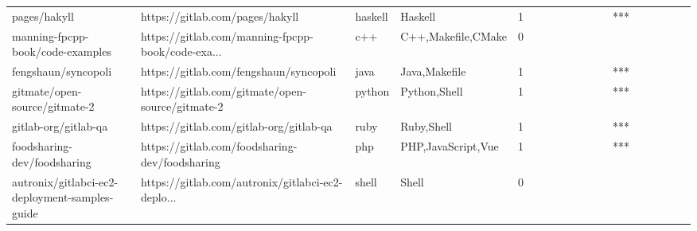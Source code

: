 \begin{tabular}{llllrlllllllllllll}
pages/hakyll                                       &                    https://gitlab.com/pages/hakyll &           haskell &                                            Haskell &       1 &         &        &           &                &                 &        &           &       *** &          &          &       &              &          \\
manning-fpcpp-book/code-examples                   &  https://gitlab.com/manning-fpcpp-book/code-exa... &               c++ &                                 C++,Makefile,CMake &       0 &         &        &           &                &                 &        &           &           &          &          &       &              &          \\
fengshaun/syncopoli                                &             https://gitlab.com/fengshaun/syncopoli &              java &                                      Java,Makefile &       1 &         &        &           &                &                 &        &           &       *** &          &          &       &              &          \\
gitmate/open-source/gitmate-2                      &   https://gitlab.com/gitmate/open-source/gitmate-2 &            python &                                       Python,Shell &       1 &         &        &           &                &                 &        &           &       *** &          &          &       &              &          \\
gitlab-org/gitlab-qa                               &            https://gitlab.com/gitlab-org/gitlab-qa &              ruby &                                         Ruby,Shell &       1 &         &        &           &                &                 &        &           &       *** &          &          &       &              &          \\
foodsharing-dev/foodsharing                        &     https://gitlab.com/foodsharing-dev/foodsharing &               php &                                 PHP,JavaScript,Vue &       1 &         &        &           &                &                 &        &           &       *** &          &          &       &              &          \\
autronix/gitlabci-ec2-deployment-samples-guide     &  https://gitlab.com/autronix/gitlabci-ec2-deplo... &             shell &                                              Shell &       0 &         &        &           &                &                 &        &           &           &          &          &       &              &          \\

\end{tabular}
